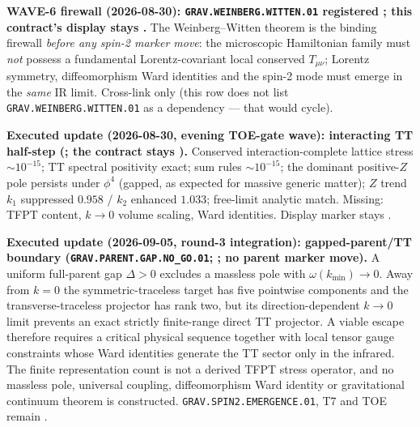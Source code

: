 \documentclass[11pt,a4paper]{article}
\begin{document}
\par\smallskip\noindent\textbf{WAVE-6 firewall (2026-08-30): \texttt{GRAV.WEINBERG.WITTEN.01}
registered \mO; this contract's display stays \mO.}
The Weinberg--Witten theorem is the binding firewall \emph{before any spin-2 marker move}:
the microscopic Hamiltonian family must \emph{not} possess a fundamental Lorentz-covariant
local conserved $T_{\mu\nu}$; Lorentz symmetry, diffeomorphism Ward identities and the
spin-2 mode must emerge in the \emph{same} IR limit.  Cross-link only (this row does not
list \texttt{GRAV.WEINBERG.WITTEN.01} as a dependency --- that would cycle).

\par\smallskip\noindent\textbf{Executed update (2026-08-30, evening TOE-gate wave): interacting
TT half-step
(; the contract stays \mO).}
Conserved interaction-complete lattice stress $\sim10^{-15}$; TT spectral positivity exact;
sum rules $\sim10^{-15}$; the dominant positive-$Z$ pole persists under $\phi^4$ (gapped, as
expected for massive generic matter); $Z$ trend $k_1$ suppressed $0.958$ / $k_2$ enhanced $1.033$;
free-limit analytic match.  Missing: TFPT content, $k\to0$ volume scaling, Ward identities.
Display marker stays \mO.

\par\smallskip\noindent\textbf{Executed update (2026-09-05, round-3 integration):
gapped-parent/TT boundary
(\texttt{GRAV.PARENT.GAP.NO\_GO.01};
; no parent
marker move).}
A uniform full-parent gap $\Delta>0$ excludes a massless pole with
$\omega(k_{\min})\to0$.  Away from $k=0$ the symmetric-traceless target has five
pointwise components and the transverse-traceless projector has rank two, but its
direction-dependent $k\to0$ limit prevents an exact strictly finite-range direct TT
projector.  A viable escape therefore requires a critical physical sequence together
with local tensor gauge constraints whose Ward identities generate the TT sector only
in the infrared.  The finite representation count is not a derived TFPT stress
operator, and no massless pole, universal coupling, diffeomorphism Ward identity or
gravitational continuum theorem is constructed.  \texttt{GRAV.SPIN2.EMERGENCE.01},
T7 and TOE remain \mO.

\end{document}
